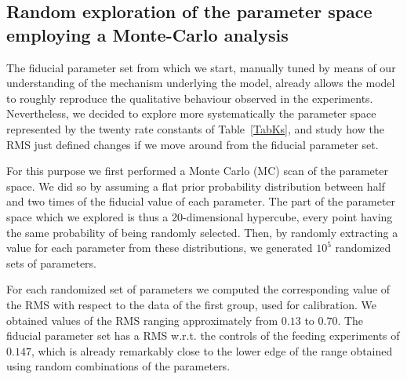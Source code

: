 \documentclass[oneside, 10pt, a4paper, twocolumn]{article}
\begin{document}
\subsection{Random exploration of the parameter space employing a Monte-Carlo analysis}

The fiducial parameter set from which we start, manually tuned by means of our understanding of the mechanism underlying the model, already allows the model to roughly reproduce the qualitative behaviour observed in the experiments. Nevertheless, we decided to explore more systematically the parameter space represented by the twenty rate constants of Table~\ref{TabKs}, and study how the RMS just defined changes if we move around from the fiducial parameter set.


For this purpose we first performed a Monte Carlo (MC) scan of the parameter space. 
We did so by assuming a flat prior probability distribution between half and two times of the fiducial value of each parameter. The part of the parameter space which we explored is thus a 20-dimensional hypercube, every point having the same probability of being randomly selected.
Then, by randomly extracting a value for each parameter from these distributions, we generated $10^5$ randomized sets of parameters.

For each randomized set of parameters we computed the corresponding value of the RMS with respect to the data of the first group, used for calibration. We obtained values of the RMS ranging approximately from $0.13$ to $0.70$. 
The fiducial parameter set has a RMS w.r.t. the controls of the feeding experiments of $0.147$, which is already remarkably close to the lower edge of the range obtained using random combinations of the parameters. 

\end{document}
